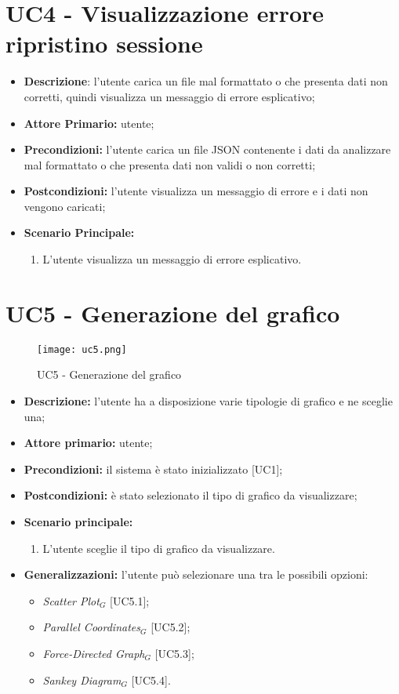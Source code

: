 \section{UC4 - Visualizzazione errore ripristino sessione}
\begin{itemize}
  \item \textbf{Descrizione}: l'utente carica un file mal formattato o che presenta dati non corretti, quindi visualizza un messaggio di errore esplicativo;
  \item \textbf{Attore Primario:} utente;
  \item \textbf{Precondizioni:} l’utente carica un file JSON contenente i dati da analizzare mal formattato o che presenta dati non validi o non corretti;
  \item \textbf{Postcondizioni:} l'utente visualizza un messaggio di errore e i dati non vengono caricati;
  \item \textbf{Scenario Principale:}
  \begin{enumerate}
    \item L'utente visualizza un messaggio di errore esplicativo.
  \end{enumerate}
\end{itemize}

\section{UC5 - Generazione del grafico}
\begin{figure}[H]
 \texttt{[image: uc5.png]}
 \caption{UC5 - Generazione del grafico}
\end{figure}

 \begin{itemize}
     \item \textbf{Descrizione:} l'utente ha a disposizione varie tipologie di grafico e ne sceglie una;
     \item \textbf{Attore primario:} utente;
     \item \textbf{Precondizioni:} il sistema è stato inizializzato [UC1];
     \item \textbf{Postcondizioni:} è stato selezionato il tipo di grafico da visualizzare;
     \item \textbf{Scenario principale:}
     \begin{enumerate}
       \item L'utente sceglie il tipo di grafico da visualizzare.
     \end{enumerate}
     \item \textbf{Generalizzazioni:} l'utente può selezionare una tra le possibili opzioni:
     \begin{itemize}
         \item \textit{Scatter Plot}$_G$ [UC5.1];
         \item \textit{Parallel Coordinates}$_G$ [UC5.2];
         \item \textit{Force-Directed Graph}$_G$ [UC5.3];
         \item \textit{Sankey Diagram}$_G$ [UC5.4].
     \end{itemize}
 \end{itemize}

